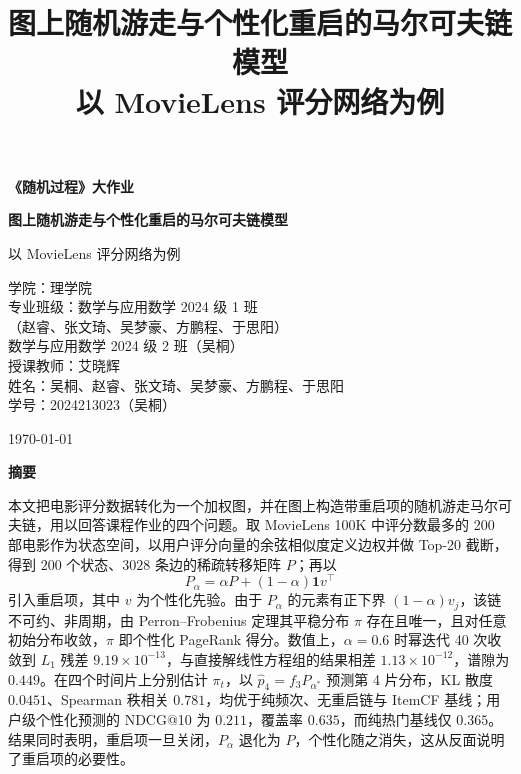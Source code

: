 \documentclass[12pt,a4paper]{ctexart}
\title{\vspace{-1.2cm}\textbf{图上随机游走与个性化重启的马尔可夫链模型}\\[4pt]
\large 以 MovieLens 评分网络为例}
\author{}
\date{}
\begin{document}
\begin{titlepage}
\centering
\vspace*{2.2cm}
{\bfseries 《随机过程》大作业\par}
\vspace{1.4cm}
{\bfseries 图上随机游走与个性化重启的马尔可夫链模型\par}
\vspace{0.5cm}
{ 以 MovieLens 评分网络为例\par}
\vspace{3.2cm}
{
\centering
学\hspace{1em}院：理学院\\[10pt]
专业班级：数学与应用数学 2024 级 1 班\\[5pt]
{（赵睿、张文琦、吴梦豪、方鹏程、于思阳）}\\[9pt]
{数学与应用数学 2024 级 2 班（吴桐）}\\[16pt]
授课教师：艾晓辉\\[16pt]
姓\hspace{1em}名：{吴桐、赵睿、张文琦、吴梦豪、方鹏程、于思阳}\\[16pt]
学\hspace{1em}号：2024213023（吴桐）\par}
\vfill
{\today\par}
\end{titlepage}

\begin{center}
{\bfseries 摘\quad 要}
\end{center}

本文把电影评分数据转化为一个加权图，并在图上构造带重启项的随机游走马尔可夫链，用以回答课程作业的四个问题。取 MovieLens 100K 中评分数最多的 200 部电影作为状态空间，以用户评分向量的余弦相似度定义边权并做 Top-20 截断，得到 $200$ 个状态、$3028$ 条边的稀疏转移矩阵 $P$；再以
\[
P_{\alpha}=\alpha P+(1-\alpha)\mathbf{1}v^{\top}
\]
引入重启项，其中 $v$ 为个性化先验。由于 $P_{\alpha}$ 的元素有正下界 $(1-\alpha)v_j$，该链不可约、非周期，由 Perron--Frobenius 定理其平稳分布 $\pi$ 存在且唯一，且对任意初始分布收敛，$\pi$ 即个性化 PageRank 得分。数值上，$\alpha=0.6$ 时幂迭代 40 次收敛到 $L_1$ 残差 $9.19\times10^{-13}$，与直接解线性方程组的结果相差 $1.13\times10^{-12}$，谱隙为 $0.449$。在四个时间片上分别估计 $\pi_t$，以 $\hat p_4=f_3P_{\alpha^*}$ 预测第 4 片分布，KL 散度 $0.0451$、Spearman 秩相关 $0.781$，均优于纯频次、无重启链与 ItemCF 基线；用户级个性化预测的 NDCG@10 为 $0.211$，覆盖率 $0.635$，而纯热门基线仅 $0.365$。结果同时表明，重启项一旦关闭，$P_{\alpha}$ 退化为 $P$，个性化随之消失，这从反面说明了重启项的必要性。
\end{document}
